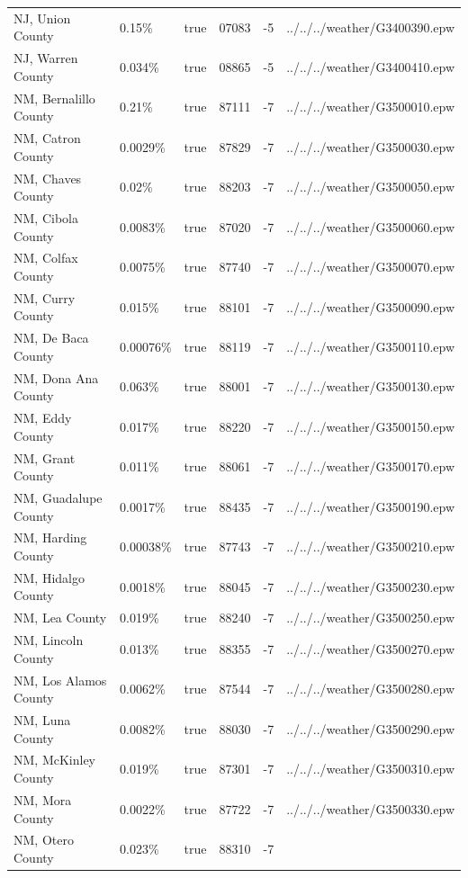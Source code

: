 \begin{longtable}[]{@{}llllll@{}}
NJ, Union County & 0.15\% & true & 07083 & -5 &
../../../weather/G3400390.epw \\
NJ, Warren County & 0.034\% & true & 08865 & -5 &
../../../weather/G3400410.epw \\
NM, Bernalillo County & 0.21\% & true & 87111 & -7 &
../../../weather/G3500010.epw \\
NM, Catron County & 0.0029\% & true & 87829 & -7 &
../../../weather/G3500030.epw \\
NM, Chaves County & 0.02\% & true & 88203 & -7 &
../../../weather/G3500050.epw \\
NM, Cibola County & 0.0083\% & true & 87020 & -7 &
../../../weather/G3500060.epw \\
NM, Colfax County & 0.0075\% & true & 87740 & -7 &
../../../weather/G3500070.epw \\
NM, Curry County & 0.015\% & true & 88101 & -7 &
../../../weather/G3500090.epw \\
NM, De Baca County & 0.00076\% & true & 88119 & -7 &
../../../weather/G3500110.epw \\
NM, Dona Ana County & 0.063\% & true & 88001 & -7 &
../../../weather/G3500130.epw \\
NM, Eddy County & 0.017\% & true & 88220 & -7 &
../../../weather/G3500150.epw \\
NM, Grant County & 0.011\% & true & 88061 & -7 &
../../../weather/G3500170.epw \\
NM, Guadalupe County & 0.0017\% & true & 88435 & -7 &
../../../weather/G3500190.epw \\
NM, Harding County & 0.00038\% & true & 87743 & -7 &
../../../weather/G3500210.epw \\
NM, Hidalgo County & 0.0018\% & true & 88045 & -7 &
../../../weather/G3500230.epw \\
NM, Lea County & 0.019\% & true & 88240 & -7 &
../../../weather/G3500250.epw \\
NM, Lincoln County & 0.013\% & true & 88355 & -7 &
../../../weather/G3500270.epw \\
NM, Los Alamos County & 0.0062\% & true & 87544 & -7 &
../../../weather/G3500280.epw \\
NM, Luna County & 0.0082\% & true & 88030 & -7 &
../../../weather/G3500290.epw \\
NM, McKinley County & 0.019\% & true & 87301 & -7 &
../../../weather/G3500310.epw \\
NM, Mora County & 0.0022\% & true & 87722 & -7 &
../../../weather/G3500330.epw \\
NM, Otero County & 0.023\% & true & 88310 & -7 &

\end{longtable}
